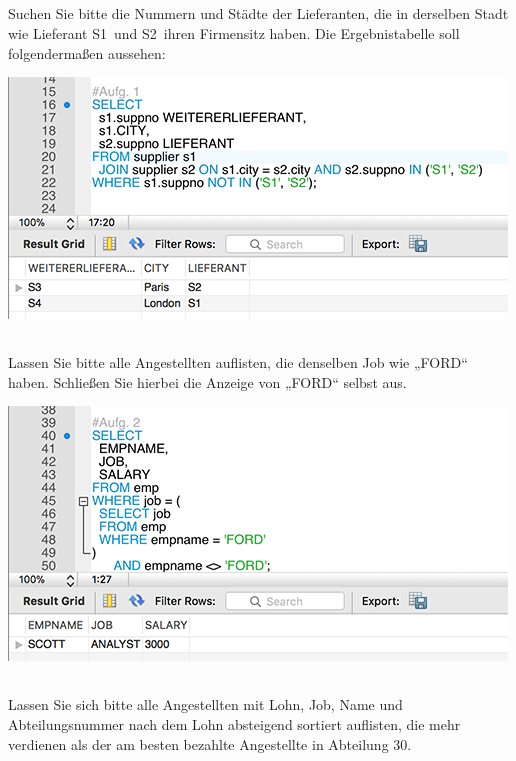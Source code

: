 \documentclass{article}
\begin{document}
\subsection{}
Suchen Sie bitte die Nummern und Städte der Lieferanten, die in derselben Stadt wie Lieferant \glqq S1\grqq\ und \glqq S2\grqq\ ihren Firmensitz haben. Die Ergebnistabelle soll folgendermaßen aussehen:

\includegraphics{company1}

\subsection{}
Lassen Sie bitte alle Angestellten auflisten, die denselben Job wie „FORD“ haben. Schließen Sie hierbei die Anzeige von „FORD“ selbst aus.

\includegraphics{company2}

\subsection{}
Lassen Sie sich bitte alle Angestellten mit Lohn, Job, Name und Abteilungsnummer nach dem Lohn absteigend sortiert auflisten, die mehr verdienen als der am besten bezahlte Angestellte in Abteilung 30.
\end{document}
